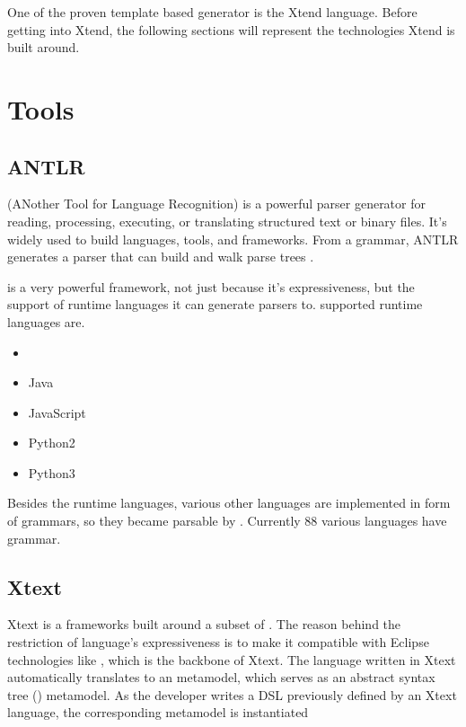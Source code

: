 One of the proven template based generator is the Xtend language. Before getting into Xtend, the following sections will represent the technologies Xtend is built around.

\section{Tools}

\subsection{ANTLR}

 (ANother Tool for Language Recognition) is a powerful parser generator for reading, processing, executing, or translating structured text or binary files. It's widely used to build languages, tools, and frameworks. From a grammar, ANTLR generates a parser that can build and walk parse trees \citep{ANTLR}.

 is a very powerful framework, not just because it's expressiveness, but the support of runtime languages it can generate parsers to.  supported runtime languages are.
\begin{itemize}
	\item {}
	\item Java
	\item JavaScript
	\item Python2
	\item Python3
\end{itemize}

Besides the runtime languages, various other languages are implemented in form of grammars, so they became parsable by . Currently 88 various languages have  grammar.

\subsection{Xtext}

Xtext is a frameworks built around a subset of . The reason behind the restriction of  language's expressiveness  is to make it compatible with Eclipse technologies like \emf, which is the backbone of Xtext. The language written in Xtext automatically translates to an \emf metamodel, which serves as an abstract syntax tree () metamodel. As the developer writes a DSL previously defined by an Xtext language, the corresponding \emf metamodel is instantiated

